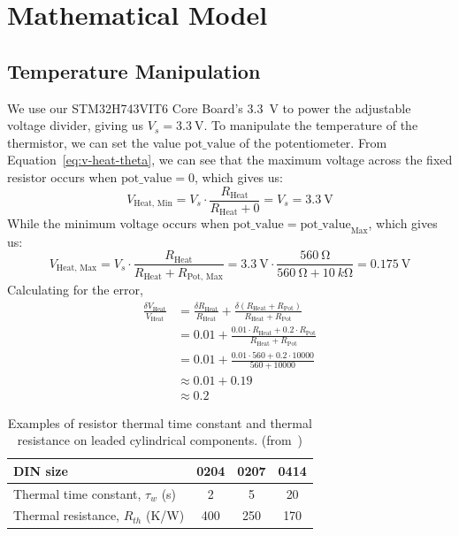 \documentclass[12pt,a4paper]{article}
\begin{document}
\section{Mathematical Model}

\subsection{Temperature Manipulation}
We use our STM32H743VIT6 Core Board's \SI{3.3}{\volt} to power the adjustable voltage divider, giving us $V_s=\SI{3.3}{\volt}$. To manipulate the temperature of the thermistor, we can set the value $\text{pot\_value}$ of the potentiometer. From Equation~\eqref{eq:v-heat-theta}, we can see that the maximum voltage across the fixed resistor occurs when $\text{pot\_value} = 0$, which gives us:
\begin{equation*}
    V_{\text{Heat, Min}} = V_s \cdot \frac{R_{\text{Heat}}}{R_{\text{Heat}} + 0} = V_s = \SI{3.3}{\volt}
\end{equation*}
While the minimum voltage occurs when $\text{pot\_value} = \text{pot\_value}_{\text{Max}}$, which gives us:
\begin{equation*}
    V_{\text{Heat, Max}} = V_s \cdot \frac{R_{\text{Heat}}}{R_{\text{Heat}} + R_{\text{Pot, Max}}} = \SI{3.3}{\volt} \cdot \frac{\SI{560}{\ohm}}{\SI{560}{\ohm} + \SI{10}{k\ohm}} = \SI{0.175}{\volt}
\end{equation*}
Calculating for the error,
\begin{align*}
    \frac{\delta V_{\text{Heat}}}{V_{\text{Heat}}} &=  \frac{\delta R_\text{Heat}}{R_\text{Heat}} + \frac{\delta (R_\text{Heat} + R_\text{Pot})}{R_\text{Heat} + R_\text{Pot}} \\
    &= 0.01 + \frac{0.01 \cdot R_\text{Heat} + 0.2 \cdot R_\text{Pot}}{R_\text{Heat} + R_\text{Pot}} \\
    &= 0.01 + \frac{0.01 \cdot 560 + 0.2 \cdot 10000}{560 + 10000} \\
    &\approx 0.01 + 0.19 \\
    &\approx 0.2
\end{align*}

\begin{table}[h!]
\centering
\begin{tabular}{lccc}
\hline
\textbf{DIN size} & \textbf{0204} & \textbf{0207} & \textbf{0414} \\
\hline
Thermal time constant, $\tau_w$ (s) & 2 & 5 & 20 \\
Thermal resistance, $R_{th}$ (K/W)  & 400 & 250 & 170 \\
\hline
\end{tabular}
\caption{Examples of resistor thermal time constant and thermal resistance on leaded cylindrical components. (from~\cite{thermal-resistance})}
\label{tab:thermal-resistance}
\end{table}
\end{document}

